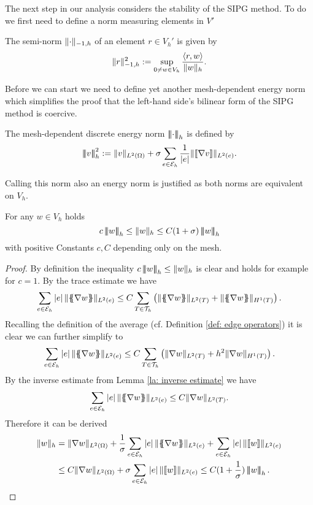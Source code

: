 The next step in our analysis considers the stability of the SIPG method. To do we first need to define a norm measuring elements in $V'$
\begin{definition} \label{def: h-1 seminorm}
	The semi-norm $\lVert \cdot \rVert_{-1,h} $ of an element $r \in V_h'$ is given by 
	\[
	\lVert r \rVert_{-1,h} ^2 := \sup_{0 \neq w \in V_h} \frac {{ \langle r, w \rangle } } {\lVert w \rVert_{h}}.
	\]
\end{definition}
Before we can start we need to define yet another mesh-dependent energy norm which simplifies the proof that the left-hand side's bilinear form of the SIPG method is coercive.
\begin{definition}\label{energy norm2}
	The mesh-dependent discrete energy norm $\left| \! \left| \! \left| \cdot \right| \! \right| \! \right|_{h} $ is defined by
	\[
	\left| \! \left| \! \left| v \right| \! \right| \! \right|_{h}^2 :=  \lVert v \rVert_{L^2(\Omega)} +  \sigma \sum_{e \in \mathcal{E}_h} \frac 1 {|e|}\lVert \llbracket \nabla v \rrbracket \rVert_{L^2(e)}.
	\]
\end{definition}
Calling this norm also an energy norm is justified as both norms are equivalent on $V_h$.
\begin{lemma}
	For any $w \in V_h$ holds
	\[
	c \eNormTwo w \leq \eNorm w \leq C(1+\sigma)\eNormTwo w
	\]
	with positive Constants $c, C$ depending only on the mesh.
\end{lemma}
\begin{proof}
	By definition the inequality $c \left| \! \left| \! \left| w \right| \! \right| \! \right|_{h} \leq \lVert w \rVert_{h}$ is clear and holds for example for $c=1$. 
	By the trace estimate we have
	\begin{align*}
	\sum_{e \in \edges} \singleNorm e \LTwonormE{\average{\nabla w}} 
	\leq C \sum_{T \in \triang} \left( \LTwonormT{\average{\nabla w}} +\HOnenormT{\average{\nabla w}}   \right).
	\end{align*}
	Recalling the definition of the average (cf. Definition \ref{def: edge operators}) it is clear we can further simplify to
	\begin{align*}
	\sum_{e \in \mathcal{E}_h} \left| e \right| \lVert \{\!\!\{ \nabla w \}\!\!\} \rVert_{L^2(e)} 
	\leq C \sum_{T \in \mathcal{T}_h} \left( \lVert \nabla w \rVert_{L^2(T)} +h^2 \lVert  \nabla w \rVert_{H^1(T)}   \right).
	\end{align*}
	By the inverse estimate from Lemma \ref{la: inverse estimate} we have 
	\begin{align}
	\sum_{e \in \mathcal{E}_h} \left| e \right| \lVert \{\!\!\{ \nabla w \}\!\!\} \rVert_{L^2(e)} \leq C \lVert \nabla w \rVert_{L^2(T)}. \label{eq: estimate average}
	\end{align}
	Therefore it can be derived
	\begin{align*}
		\eNorm{w} 
		&= \LTwonorm{\nabla w} 
			+ \frac 1 \sigma \sum_{e \in \edges} \singleNorm e \LTwonormE{\average{\nabla w}}  
			+ \sum_{e \in \edges} \singleNorm e \LTwonormE{\jump{w}} \\
		&\leq C \LTwonorm{\nabla w} 
			+ \sigma \sum_{e \in \edges} \singleNorm e \LTwonormE{\jump{w}} 
		\leq C(1+\frac 1 \sigma) \eNormTwo{w}.
	\end{align*}
	
	
\end{proof}

